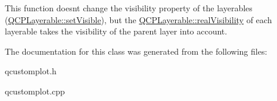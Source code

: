 This function doesn\textquotesingle{}t change the visibility property of the layerables (\hyperlink{classQCPLayerable_a3bed99ddc396b48ce3ebfdc0418744f8}{Q\+C\+P\+Layerable\+::set\+Visible}), but the \hyperlink{classQCPLayerable_a30809f7455e9794bca7b6c737622fa63}{Q\+C\+P\+Layerable\+::real\+Visibility} of each layerable takes the visibility of the parent layer into account. 

The documentation for this class was generated from the following files\+:\begin{DoxyCompactItemize}
\item 
qcustomplot.\+h\item 
qcustomplot.\+cpp\end{DoxyCompactItemize}
